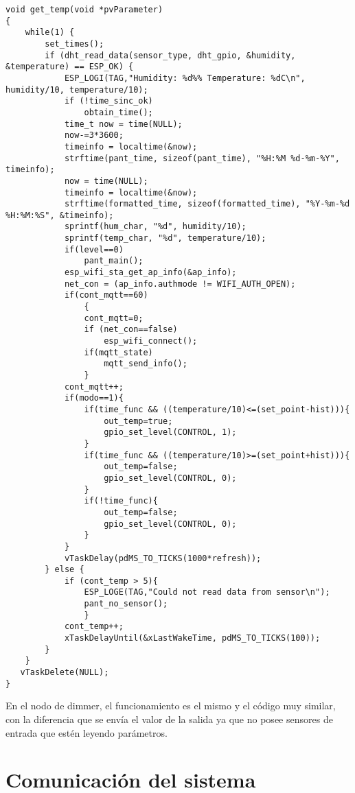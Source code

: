 \begin{lstlisting}[caption={Código de lectura de temperatura.}, label={lst:temp.c}]
void get_temp(void *pvParameter)
{
    while(1) {
        set_times();
        if (dht_read_data(sensor_type, dht_gpio, &humidity, &temperature) == ESP_OK) {
            ESP_LOGI(TAG,"Humidity: %d%% Temperature: %dC\n", humidity/10, temperature/10);
            if (!time_sinc_ok)
                obtain_time();
            time_t now = time(NULL);
            now-=3*3600;
            timeinfo = localtime(&now);
            strftime(pant_time, sizeof(pant_time), "%H:%M %d-%m-%Y", timeinfo);
            now = time(NULL);
            timeinfo = localtime(&now);
            strftime(formatted_time, sizeof(formatted_time), "%Y-%m-%d %H:%M:%S", &timeinfo);
            sprintf(hum_char, "%d", humidity/10);
			sprintf(temp_char, "%d", temperature/10);
            if(level==0)
                pant_main();
            esp_wifi_sta_get_ap_info(&ap_info);
            net_con = (ap_info.authmode != WIFI_AUTH_OPEN);
            if(cont_mqtt==60)
                {
                cont_mqtt=0;
                if (net_con==false)
                    esp_wifi_connect();
                if(mqtt_state)    
                    mqtt_send_info();
                }
            cont_mqtt++;
            if(modo==1){
                if(time_func && ((temperature/10)<=(set_point-hist))){
                    out_temp=true;
                    gpio_set_level(CONTROL, 1);
                }
                if(time_func && ((temperature/10)>=(set_point+hist))){
                    out_temp=false;
                    gpio_set_level(CONTROL, 0);
                }
                if(!time_func){
                    out_temp=false;
                    gpio_set_level(CONTROL, 0);
                }
            }
            vTaskDelay(pdMS_TO_TICKS(1000*refresh));
        } else {
            if (cont_temp > 5){
                ESP_LOGE(TAG,"Could not read data from sensor\n");
			    pant_no_sensor();
                }
            cont_temp++;
            xTaskDelayUntil(&xLastWakeTime, pdMS_TO_TICKS(100));
        }
    }
   vTaskDelete(NULL);
}
\end{lstlisting}

En el nodo de dimmer, el funcionamiento es el mismo y el código muy similar, con la diferencia que se envía el valor de la salida ya que no posee sensores de entrada que estén leyendo parámetros.

\section{Comunicación del sistema}

